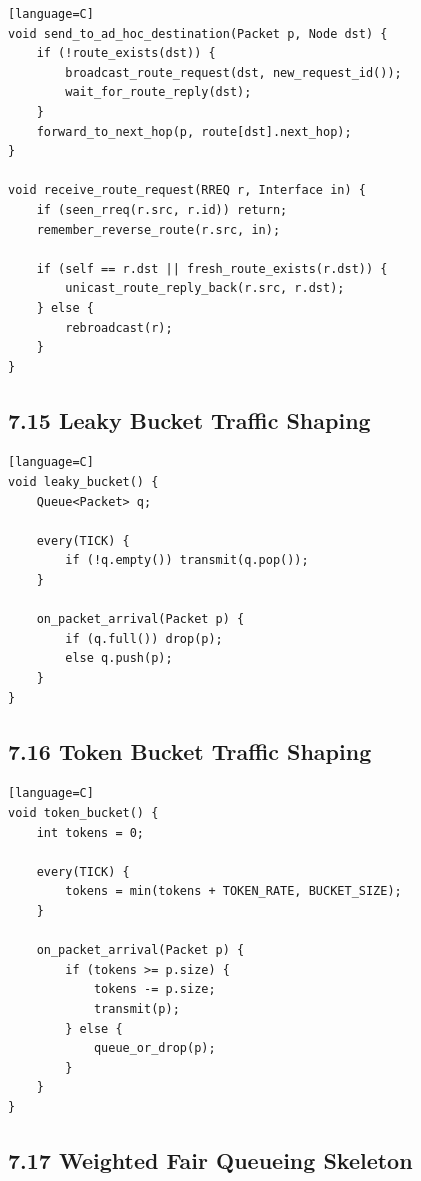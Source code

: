 \documentclass[11pt]{article}
\begin{document}
\begin{verbatim}[language=C]
void send_to_ad_hoc_destination(Packet p, Node dst) {
    if (!route_exists(dst)) {
        broadcast_route_request(dst, new_request_id());
        wait_for_route_reply(dst);
    }
    forward_to_next_hop(p, route[dst].next_hop);
}

void receive_route_request(RREQ r, Interface in) {
    if (seen_rreq(r.src, r.id)) return;
    remember_reverse_route(r.src, in);

    if (self == r.dst || fresh_route_exists(r.dst)) {
        unicast_route_reply_back(r.src, r.dst);
    } else {
        rebroadcast(r);
    }
}
\end{verbatim}

\subsection{7.15 Leaky Bucket Traffic
Shaping}\label{leaky-bucket-traffic-shaping}

\begin{verbatim}[language=C]
void leaky_bucket() {
    Queue<Packet> q;

    every(TICK) {
        if (!q.empty()) transmit(q.pop());
    }

    on_packet_arrival(Packet p) {
        if (q.full()) drop(p);
        else q.push(p);
    }
}
\end{verbatim}

\subsection{7.16 Token Bucket Traffic
Shaping}\label{token-bucket-traffic-shaping}

\begin{verbatim}[language=C]
void token_bucket() {
    int tokens = 0;

    every(TICK) {
        tokens = min(tokens + TOKEN_RATE, BUCKET_SIZE);
    }

    on_packet_arrival(Packet p) {
        if (tokens >= p.size) {
            tokens -= p.size;
            transmit(p);
        } else {
            queue_or_drop(p);
        }
    }
}
\end{verbatim}

\subsection{7.17 Weighted Fair Queueing
Skeleton}\label{weighted-fair-queueing-skeleton}
\end{document}
